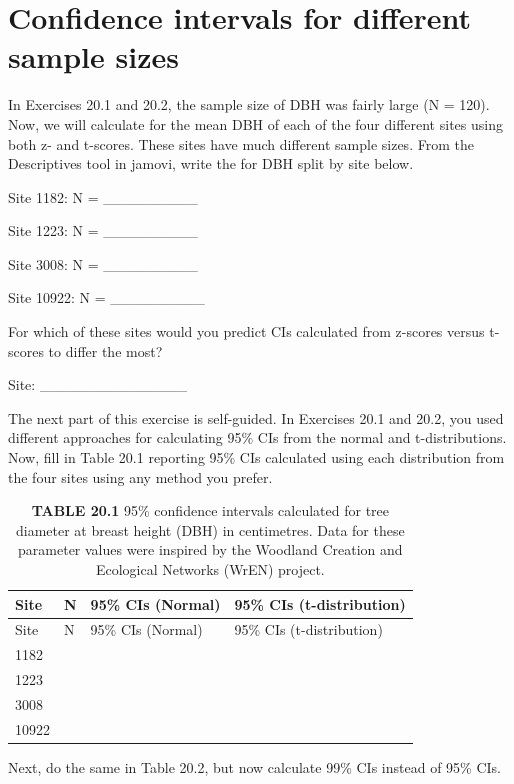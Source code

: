 \documentclass[
  openany]{krantz}
\begin{document}
\hypertarget{confidence-intervals-for-different-sample-sizes}{%
\section{Confidence intervals for different sample sizes}\label{confidence-intervals-for-different-sample-sizes}}

In Exercises 20.1 and 20.2, the sample size of DBH was fairly large (N = 120).
Now, we will calculate  for the mean DBH of each of the four different sites using both z- and t-scores.
These sites have much different sample sizes.
From the Descriptives tool in jamovi, write the  for DBH split by site below.

Site 1182: N = \_\_\_\_\_\_\_\_\_

Site 1223: N = \_\_\_\_\_\_\_\_\_

Site 3008: N = \_\_\_\_\_\_\_\_\_

Site 10922: N = \_\_\_\_\_\_\_\_\_

For which of these sites would you predict CIs calculated from z-scores versus t-scores to differ the most?

Site: \_\_\_\_\_\_\_\_\_\_\_\_\_\_

The next part of this exercise is self-guided.
In Exercises 20.1 and 20.2, you used different approaches for calculating 95\% CIs from the normal and t-distributions.
Now, fill in Table 20.1 reporting 95\% CIs calculated using each distribution from the four sites using any method you prefer.

\begin{longtable}[]{@{}llll@{}}
\caption{\textbf{TABLE 20.1} 95\% confidence intervals calculated for tree diameter at breast height (DBH) in centimetres. Data for these parameter values were inspired by the Woodland Creation and Ecological Networks (WrEN) project.}\tabularnewline
\toprule
Site & N & 95\% CIs (Normal) & 95\% CIs (t-distribution) \\
\midrule
\endfirsthead
\toprule
Site & N & 95\% CIs (Normal) & 95\% CIs (t-distribution) \\
\midrule
\endhead
1182 & & & \\
1223 & & & \\
3008 & & & \\
10922 & & & \\
\bottomrule
\end{longtable}

Next, do the same in Table 20.2, but now calculate 99\% CIs instead of 95\% CIs.
\end{document}

